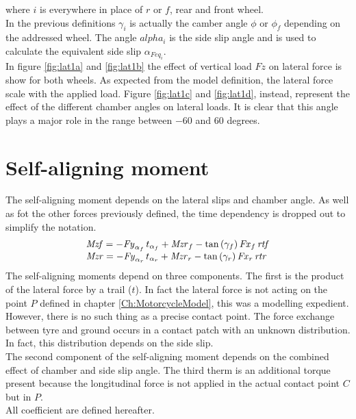 %
where $i$ is everywhere in place of $r$ or $f$, rear and front wheel.\\
In the previous definitions $\gamma_i$ is actually the camber angle $\phi$ or $\phi_f$ depending on the addressed wheel. The angle $alpha_i$ is the side slip angle and is used to calculate the equivalent side slip $\alpha_{Feq_i}$.\\
In figure \ref{fig:lat1a} and \ref{fig:lat1b} the effect of vertical load $Fz$ on lateral force is show for both wheels. As expected from the model definition, the lateral force scale with the applied load. Figure \ref{fig:lat1c} and \ref{fig:lat1d}, instead, represent the effect of the different chamber angles on lateral loads. It is clear that this angle plays a major role in the range between $-60$ and $60$ degrees. 
%
\section{Self-aligning moment}
%
The self-aligning moment depends on the lateral slips and chamber angle. As well as fot the other forces previously defined, the time dependency is dropped out to simplify the notation.  
%
\begin{equation}
    \begin{array}{l} 
        {\it Mzf}  =-{\it Fy}_{
        \alpha_{f}}\,t_{\alpha_{f}}+{\it Mzr}_{f}-\tan \left( \gamma_{f}
         \right) {\it Fx}_{f}\,{\it rtf}\\ {\it Mzr} =-{\it Fy}_{\alpha_{r}}\,t_{\alpha_{r}}+{\it Mzr}_{r}-\tan
         \left( \gamma_{r} \right) {\it Fx}_{r}\,{\it rtr}
    \end{array}          
\end{equation}
%
The self-aligning moments depend on three components. The first is the product of the lateral force by a trail ($t$). In fact the lateral force is not acting on the point $P$ defined in chapter \ref{Ch:MotorcycleModel}, this was a modelling expedient. However, there is no such thing as a precise contact point. The force exchange between tyre and ground occurs in a contact patch with an unknown distribution. In fact, this distribution depends on the side slip.\\
The second component of the self-aligning moment depends on the combined effect of chamber and side slip angle. The third therm is an additional torque present because the longitudinal force is not applied in the actual contact point $C$ but in $P$.\cite{pacejka2012tire} \\
All coefficient are defined hereafter.
